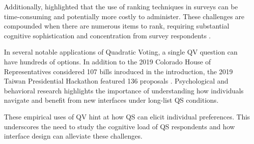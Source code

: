 Additionally, \textcite{alwinMeasurementValuesSurveys1985} highlighted that the use of ranking techniques in surveys can be time-consuming and potentially more costly to administer. These challenges are compounded when there are numerous items to rank, requiring substantial cognitive sophistication and concentration from survey respondents \cite{featherMeasurementValuesEffects1973}.

In several notable applications of Quadratic Voting, a single QV question can have hundreds of options. In addition to the 2019 Colorado House of Representatives considered 107 bills \cite{coyNewWayVoting2019} inroduced in the introduction, the 2019 Taiwan Presidential Hackathon featured 136 proposals \cite{QuadraticVotingFrontend2022}. Psychological and behavioral research highlights the importance of understanding how individuals navigate and benefit from new interfaces under long-list QS conditions.

These empirical uses of QV hint at how QS can elicit individual preferences. This underscores the need to study the cognitive load of QS respondents and how interface design can alleviate these challenges.


